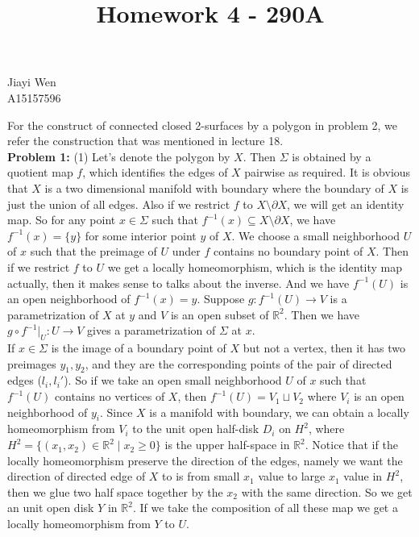 \documentclass[12pt]{amsart}
\newcommand{\R}{\mathbb{R}}
\begin{document}
\title{Homework 4 - 290A}
\maketitle
\begin{center}
    Jiayi Wen\\
    A15157596
\end{center}
For the construct of connected closed 2-surfaces by a polygon in problem 2, we refer the construction that was mentioned in lecture 18.\\
\textbf{Problem 1:} (1) Let's denote the polygon by $X$. Then $\Sigma$ is obtained by a quotient map $f$, which identifies the edges of $X$ pairwise as required. It is obvious that $X$ is a two dimensional manifold with boundary where the boundary of $X$ is just the union of all edges. Also if we restrict $f$ to $X\setminus \partial X$, we will get an identity map. So for any point $x\in\Sigma$ such that $f^{-1}(x)\subseteq X\setminus\partial X$, we have $f^{-1}(x)=\{y\}$ for some interior point $y$ of $X$. We choose a small neighborhood $U$ of $x$ such that the preimage of $U$ under $f$ contains no boundary point of $X$. Then if we restrict $f$ to $U$ we get a locally homeomorphism, which is the identity map actually, then it makes sense to talks about the inverse. And we have $f^{-1}(U)$ is an open neighborhood of $f^{-1}(x)=y$. Suppose $g: f^{-1}(U)\to V$ is a parametrization of $X$ at $y$ and $V$ is an open subset of $\R^2$. Then we have $g\circ f^{-1}|_{U}:U\to V$ gives a parametrization of $\Sigma$ at $x$.\\
If $x\in\Sigma$ is the image of a boundary point of $X$ but not a vertex, then it has two preimages $y_1,y_2$, and they are the corresponding points of the pair of directed edges ($l_i,l_i'$). So if we take an open small neighborhood $U$ of $x$ such that  $f^{-1}(U)$ contains no vertices of $X$, then $f^{-1}(U)=V_1\sqcup V_2$ where $V_i$ is an open neighborhood of $y_i$. Since $X$ is a manifold with boundary, we can obtain a locally homeomorphism from $V_i$ to the unit open half-disk $D_i$ on $H^2$, where $H^2=\{(x_1,x_2)\in\R^2\mid x_2\geq 0\}$ is the upper half-space in $\R^2$. Notice that if the locally homeomorphism preserve the direction of the edges, namely we want the direction of directed edge of $X$ to is from small $x_1$ value to large $x_1$ value in $H^2$, then we glue two half space together by the $x_2$ with the same direction. So we get an unit open disk $Y$ in $\R^2$. If we take the composition of all these map we get a locally homeomorphism from $Y$ to $U$.\\
\end{document}
